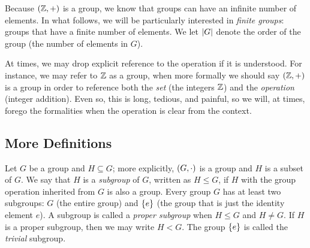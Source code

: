 Because $\left( \mathbb{Z},+ \right)$ is a \gls{group}, we know that \glspl{group} can have
an infinite number of elements.
In what follows, we will be particularly interested
in \emph{\glspl{finite group}}:
\glspl{group} that have a finite number of elements.
We let $\left| G \right|$ denote the order of the \gls{group}
(the number of elements in $G$).

At times, we may drop explicit reference to the operation if it is understood.
For instance, we may refer to $\mathbb{Z}$ as a \gls{group},
when more formally we should say $\left( \mathbb{Z},+ \right)$ is a \gls{group}
in order to reference both the \emph{\gls{set}} (the integers $\mathbb{Z}$)
and the \emph{operation} (integer addition).
Even so, this is long, tedious, and painful, so we will,
at times, forego the formalities when the operation is clear
from the context.

\subsection{More Definitions}
Let $G$ be a \gls{group} and $H \subseteq G$;
more explicitly, $\left( G,\cdot \right)$ is a \gls{group} and $H$ is a subset of $G$.
We say that $H$ is a \emph{\gls{subgroup}} of $G$, written as $H \le G$,
if $H$ with the group operation inherited from $G$ is also a \gls{group}.
Every \gls{group} $G$ has at least two \glspl{subgroup}:
$G$ (the entire group) and $\left\{ e \right\}$
(the group that is just the identity element $e$).
A \gls{subgroup} is called a \emph{proper subgroup} when
$H\le G$ and $H\ne G$.
If $H$ is a proper subgroup, then we may write $H < G$.
The \gls{group} $\left\{ e \right\}$ is called the \emph{trivial} subgroup.

